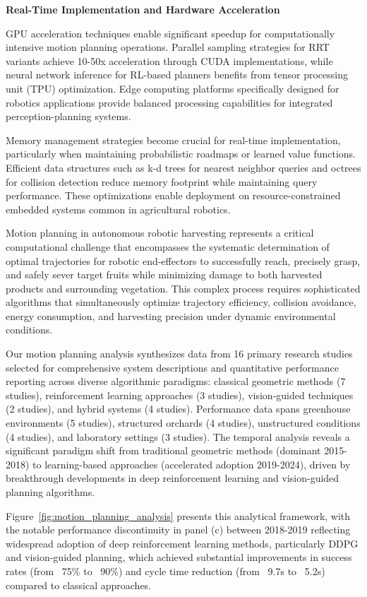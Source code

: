 \documentclass{ieeeaccess}
\begin{document}
\textbf{Real-Time Implementation and Hardware Acceleration}

GPU acceleration techniques enable significant speedup for computationally intensive motion planning operations. Parallel sampling strategies for RRT variants achieve 10-50x acceleration through CUDA implementations, while neural network inference for RL-based planners benefits from tensor processing unit (TPU) optimization. Edge computing platforms specifically designed for robotics applications provide balanced processing capabilities for integrated perception-planning systems.

Memory management strategies become crucial for real-time implementation, particularly when maintaining probabilistic roadmaps or learned value functions. Efficient data structures such as k-d trees for nearest neighbor queries and octrees for collision detection reduce memory footprint while maintaining query performance. These optimizations enable deployment on resource-constrained embedded systems common in agricultural robotics.

Motion planning in autonomous robotic harvesting represents a critical computational challenge that encompasses the systematic determination of optimal trajectories for robotic end-effectors to successfully reach, precisely grasp, and safely sever target fruits while minimizing damage to both harvested products and surrounding vegetation. This complex process requires sophisticated algorithms that simultaneously optimize trajectory efficiency, collision avoidance, energy consumption, and harvesting precision under dynamic environmental conditions.

Our motion planning analysis synthesizes data from 16 primary research studies selected for comprehensive system descriptions and quantitative performance reporting across diverse algorithmic paradigms: classical geometric methods (7 studies), reinforcement learning approaches (3 studies), vision-guided techniques (2 studies), and hybrid systems (4 studies). Performance data spans greenhouse environments (5 studies), structured orchards (4 studies), unstructured conditions (4 studies), and laboratory settings (3 studies). The temporal analysis reveals a significant paradigm shift from traditional geometric methods (dominant 2015-2018) to learning-based approaches (accelerated adoption 2019-2024), driven by breakthrough developments in deep reinforcement learning and vision-guided planning algorithms.

Figure~\ref{fig:motion_planning_analysis} presents this analytical framework, with the notable performance discontinuity in panel (c) between 2018-2019 reflecting widespread adoption of deep reinforcement learning methods, particularly DDPG and vision-guided planning, which achieved substantial improvements in success rates (from ~75\% to ~90\%) and cycle time reduction (from ~9.7s to ~5.2s) compared to classical approaches.
\end{document}
